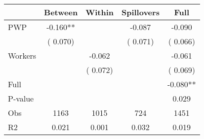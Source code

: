 
\begin{tabular}{l*{4}{c}}\hline&\multicolumn{1}{c}{Between}&\multicolumn{1}{c}{Within}&\multicolumn{1}{c}{Spillovers}&\multicolumn{1}{c}{Full}\\ \hline
 PWP           &             -0.160**      &                                               &       -0.087 &        -0.090                            \\ 
                               &        (       0.070)           &                                       &       (       0.071)     &      (       0.066)                                           \\ 
 Workers       &                                               &       -0.062    &                                &            -0.061                            \\ 
                               &                                               & (       0.072)                  &                                        &      (       0.069)                                           \\ 
\hline                                                                                                                                                                                                                                            
 Full                  &                                               &                                               &                                        &            -0.080**                                     \\ 
 P-value               &                                               &                                               &                                        &             0.029                                           \\ 
 Obs                   &               1163               &       1015                       &       724                &              1451                                               \\ 
 R2                    &                      0.021              &              0.001                      &              0.032               &                     0.019                                              \\ 
\hline \end{tabular}                                                                                                                                                                                                              